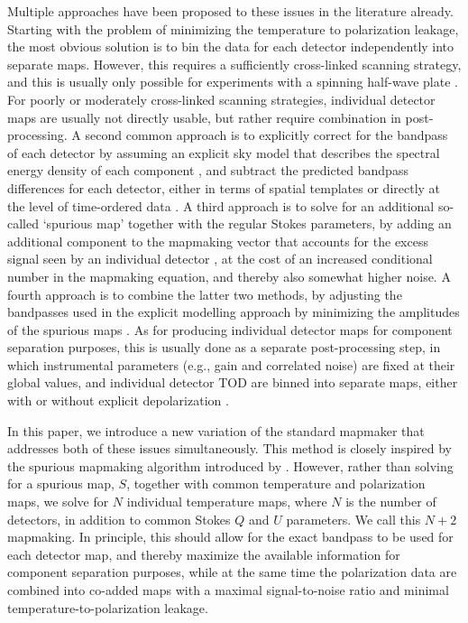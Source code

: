 \documentclass{aa}
\begin{document}
Multiple approaches have been proposed to these issues in the literature already. Starting with the problem of minimizing the temperature to polarization leakage, the most obvious solution is to bin the data for each detector independently into separate maps. However, this requires a sufficiently cross-linked scanning strategy, and this is usually only possible for experiments with a spinning half-wave plate \citep[e.g.,][]{abs:2016}. For poorly or moderately cross-linked scanning strategies, individual detector maps are usually not directly usable, but rather require combination in post-processing. A second common approach is to explicitly correct for the bandpass of each detector by assuming an explicit sky model that describes the spectral energy density of each component \citep[e.g.,][]{planck_fg:2015}, and subtract the predicted bandpass differences for each detector, either in terms of spatial templates \citep[e.g.,][]{lfi2015} or directly at the level of time-ordered data \citep{bp01}. A third approach is to solve for an additional so-called `spurious map' together with the regular Stokes parameters, by adding an additional component to the mapmaking vector that accounts for the excess signal seen by an individual detector \citep{spurious}, at the cost of an increased conditional number in the mapmaking equation, and thereby also somewhat higher noise. A fourth approach is to combine the latter two methods, by adjusting the bandpasses used in the explicit modelling approach by minimizing the amplitudes of the spurious maps \citep{BP09}. As for producing individual detector maps for component separation purposes, this is usually done as a separate post-processing step, in which instrumental parameters (e.g., gain and correlated noise) are fixed at their global values, and individual detector TOD are binned into separate maps, either with or without explicit depolarization \citep[e.g.,][]{npipe}.

In this paper, we introduce a new variation of the standard mapmaker that addresses both of these issues simultaneously. This method is closely inspired by the spurious mapmaking algorithm introduced by \citet{spurious}. However, rather than solving for a spurious map, $S$, together with common temperature and polarization maps, we solve for $N$ individual temperature maps, where $N$ is the number of detectors, in addition to common Stokes $Q$ and $U$ parameters. We call this $N+2$ mapmaking. In principle, this should allow for the exact bandpass to be used for each detector map, and thereby maximize the available information for component separation purposes, while at the same time the polarization data are combined into co-added maps with a maximal signal-to-noise ratio and minimal temperature-to-polarization leakage. 
\end{document}
